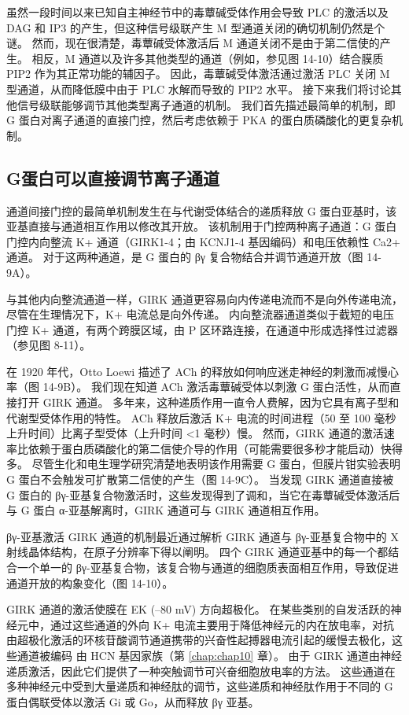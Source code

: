虽然一段时间以来已知自主神经节中的毒蕈碱受体作用会导致 PLC 的激活以及 DAG 和 IP3 的产生，但这种信号级联产生 M 型通道关闭的确切机制仍然是个谜。 
然而，现在很清楚，毒蕈碱受体激活后 M 通道关闭不是由于第二信使的产生。 
相反，M 通道以及许多其他类型的通道（例如，参见图 14-10）结合膜质 PIP2 作为其正常功能的辅因子。 
因此，毒蕈碱受体激活通过激活 PLC 关闭 M 型通道，从而降低膜中由于 PLC 水解而导致的 PIP2 水平。 
接下来我们将讨论其他信号级联能够调节其他类型离子通道的机制。 
我们首先描述最简单的机制，即 G 蛋白对离子通道的直接门控，然后考虑依赖于 PKA 的蛋白质磷酸化的更复杂机制。



\subsection{G蛋白可以直接调节离子通道}
通道间接门控的最简单机制发生在与代谢受体结合的递质释放 G 蛋白亚基时，该亚基直接与通道相互作用以修改其开放。 
该机制用于门控两种离子通道：G 蛋白门控内向整流 K+ 通道（GIRK1-4；由 KCNJ1-4 基因编码）和电压依赖性 Ca2+ 通道。 对于这两种通道，是 G 蛋白的 βγ 复合物结合并调节通道开放（图 14-9A）。


与其他内向整流通道一样，GIRK 通道更容易向内传递电流而不是向外传递电流，尽管在生理情况下，K+ 电流总是向外传递。 
内向整流器通道类似于截短的电压门控 K+ 通道，有两个跨膜区域，由 P 区环路连接，在通道中形成选择性过滤器（参见图 8-11）。


在 1920 年代，Otto Loewi 描述了 ACh 的释放如何响应迷走神经的刺激而减慢心率（图 14-9B）。 
我们现在知道 ACh 激活毒蕈碱受体以刺激 G 蛋白活性，从而直接打开 GIRK 通道。 
多年来，这种递质作用一直令人费解，因为它具有离子型和代谢型受体作用的特性。 
ACh 释放后激活 K+ 电流的时间进程（50 至 100 毫秒上升时间）比离子型受体（上升时间 <1 毫秒）慢。 
然而，GIRK 通道的激活速率比依赖于蛋白质磷酸化的第二信使介导的作用（可能需要很多秒才能启动）快得多。 
尽管生化和电生理学研究清楚地表明该作用需要 G 蛋白，但膜片钳实验表明 G 蛋白不会触发可扩散第二信使的产生（图 14-9C）。 
当发现 GIRK 通道直接被 G 蛋白的 βγ-亚基复合物激活时，这些发现得到了调和，当它在毒蕈碱受体激活后与 G 蛋白 α-亚基解离时，GIRK 通道可与 GIRK 通道相互作用。


βγ-亚基激活 GIRK 通道的机制最近通过解析 GIRK 通道与 βγ-亚基复合物中的 X 射线晶体结构，在原子分辨率下得以阐明。 
四个 GIRK 通道亚基中的每一个都结合一个单一的 βγ-亚基复合物，该复合物与通道的细胞质表面相互作用，导致促进通道开放的构象变化（图 14-10）。


GIRK 通道的激活使膜在 EK (–80 mV) 方向超极化。 
在某些类别的自发活跃的神经元中，通过这些通道的外向 K+ 电流主要用于降低神经元的内在放电率，对抗由超极化激活的环核苷酸调节通道携带的兴奋性起搏器电流引起的缓慢去极化，这些通道被编码 由 HCN 基因家族（第 \ref{chap:chap10} 章）。 
由于 GIRK 通道由神经递质激活，因此它们提供了一种突触调节可兴奋细胞放电率的方法。 
这些通道在多种神经元中受到大量递质和神经肽的调节，这些递质和神经肽作用于不同的 G 蛋白偶联受体以激活 Gi 或 Go，从而释放 βγ 亚基。


